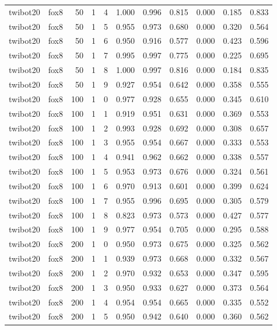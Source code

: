 \begin{tabular}{llrrrrrrrrr}
twibot20 & fox8 & 50 & 1 & 4 & 1.000 & 0.996 & 0.815 & 0.000 & 0.185 & 0.833 \\
twibot20 & fox8 & 50 & 1 & 5 & 0.955 & 0.973 & 0.680 & 0.000 & 0.320 & 0.564 \\
twibot20 & fox8 & 50 & 1 & 6 & 0.950 & 0.916 & 0.577 & 0.000 & 0.423 & 0.596 \\
twibot20 & fox8 & 50 & 1 & 7 & 0.995 & 0.997 & 0.775 & 0.000 & 0.225 & 0.695 \\
twibot20 & fox8 & 50 & 1 & 8 & 1.000 & 0.997 & 0.816 & 0.000 & 0.184 & 0.835 \\
twibot20 & fox8 & 50 & 1 & 9 & 0.927 & 0.954 & 0.642 & 0.000 & 0.358 & 0.555 \\
twibot20 & fox8 & 100 & 1 & 0 & 0.977 & 0.928 & 0.655 & 0.000 & 0.345 & 0.610 \\
twibot20 & fox8 & 100 & 1 & 1 & 0.919 & 0.951 & 0.631 & 0.000 & 0.369 & 0.553 \\
twibot20 & fox8 & 100 & 1 & 2 & 0.993 & 0.928 & 0.692 & 0.000 & 0.308 & 0.657 \\
twibot20 & fox8 & 100 & 1 & 3 & 0.955 & 0.954 & 0.667 & 0.000 & 0.333 & 0.553 \\
twibot20 & fox8 & 100 & 1 & 4 & 0.941 & 0.962 & 0.662 & 0.000 & 0.338 & 0.557 \\
twibot20 & fox8 & 100 & 1 & 5 & 0.953 & 0.973 & 0.676 & 0.000 & 0.324 & 0.561 \\
twibot20 & fox8 & 100 & 1 & 6 & 0.970 & 0.913 & 0.601 & 0.000 & 0.399 & 0.624 \\
twibot20 & fox8 & 100 & 1 & 7 & 0.955 & 0.996 & 0.695 & 0.000 & 0.305 & 0.579 \\
twibot20 & fox8 & 100 & 1 & 8 & 0.823 & 0.973 & 0.573 & 0.000 & 0.427 & 0.577 \\
twibot20 & fox8 & 100 & 1 & 9 & 0.977 & 0.954 & 0.705 & 0.000 & 0.295 & 0.588 \\
twibot20 & fox8 & 200 & 1 & 0 & 0.950 & 0.973 & 0.675 & 0.000 & 0.325 & 0.562 \\
twibot20 & fox8 & 200 & 1 & 1 & 0.939 & 0.973 & 0.668 & 0.000 & 0.332 & 0.567 \\
twibot20 & fox8 & 200 & 1 & 2 & 0.970 & 0.932 & 0.653 & 0.000 & 0.347 & 0.595 \\
twibot20 & fox8 & 200 & 1 & 3 & 0.950 & 0.933 & 0.627 & 0.000 & 0.373 & 0.564 \\
twibot20 & fox8 & 200 & 1 & 4 & 0.954 & 0.954 & 0.665 & 0.000 & 0.335 & 0.552 \\
twibot20 & fox8 & 200 & 1 & 5 & 0.950 & 0.942 & 0.640 & 0.000 & 0.360 & 0.562 \\

\end{tabular}
